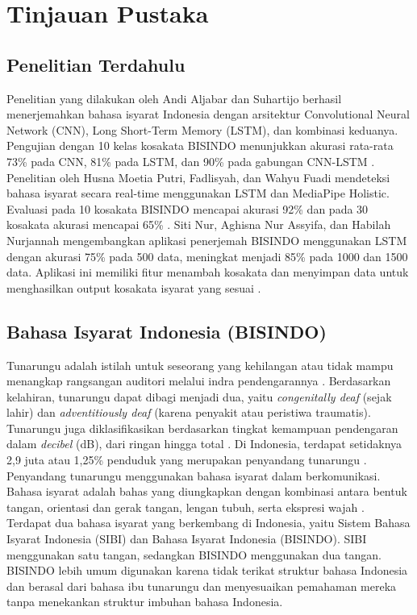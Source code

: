 \section{Tinjauan Pustaka}
\label{sec:tinjauanpustaka}

\subsection{Penelitian Terdahulu}
\label{subsec:penelitianterdahulu}

Penelitian yang dilakukan oleh Andi Aljabar dan Suhartijo berhasil menerjemahkan bahasa isyarat Indonesia dengan arsitektur Convolutional Neural Network (CNN), Long Short-Term Memory (LSTM), dan kombinasi keduanya. Pengujian dengan 10 kelas kosakata BISINDO menunjukkan akurasi rata-rata 73\% pada CNN, 81\% pada LSTM, dan 90\% pada gabungan CNN-LSTM \cite{aljabar2020}. Penelitian oleh Husna Moetia Putri, Fadlisyah, dan Wahyu Fuadi mendeteksi bahasa isyarat secara real-time menggunakan LSTM dan MediaPipe Holistic. Evaluasi pada 10 kosakata BISINDO mencapai akurasi 92\% dan pada 30 kosakata akurasi mencapai 65\% \cite{putri2022}. Siti Nur, Aghisna Nur Assyifa, dan Habilah Nurjannah mengembangkan aplikasi penerjemah BISINDO menggunakan LSTM dengan akurasi 75\% pada 500 data, meningkat menjadi 85\% pada 1000 dan 1500 data. Aplikasi ini memiliki fitur menambah kosakata dan menyimpan data untuk menghasilkan output kosakata isyarat yang sesuai \cite{nur2023}.

\subsection{Bahasa Isyarat Indonesia (BISINDO)}
\label{subsec:tunarungu}

Tunarungu adalah istilah untuk seseorang yang kehilangan atau tidak mampu menangkap rangsangan auditori melalui indra pendengarannya \cite{mursita2015}. Berdasarkan kelahiran, tunarungu dapat dibagi menjadi dua, yaitu \emph{congenitally deaf} (sejak lahir) dan \emph{adventitiously deaf} (karena penyakit atau peristiwa traumatis). Tunarungu juga diklasifikasikan berdasarkan tingkat kemampuan pendengaran dalam \emph{decibel} (dB), dari ringan hingga total \cite{winarsih2007}. Di Indonesia, terdapat setidaknya 2,9 juta atau 1,25\% penduduk yang merupakan penyandang tunarungu \cite{evitasari2015}. 
Penyandang tunarungu menggunakan bahasa isyarat dalam berkomunikasi. Bahasa isyarat adalah bahas yang diungkapkan dengan kombinasi antara bentuk tangan, orientasi dan gerak tangan, lengan tubuh, serta ekspresi wajah \cite{mursita2015}. Terdapat dua bahasa isyarat yang berkembang di Indonesia, yaitu Sistem Bahasa Isyarat Indonesia (SIBI) dan Bahasa Isyarat Indonesia (BISINDO). SIBI menggunakan satu tangan, sedangkan BISINDO menggunakan dua tangan. BISINDO lebih umum digunakan karena tidak terikat struktur bahasa Indonesia dan berasal dari bahasa ibu tunarungu dan menyesuaikan pemahaman mereka tanpa menekankan struktur imbuhan bahasa Indonesia.

